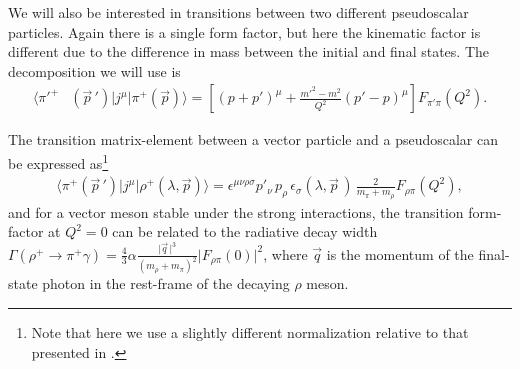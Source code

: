 We will also be interested in transitions between two different pseudoscalar particles. Again there is a single form factor, but here the kinematic factor is different due to the difference in mass between the initial and final states. The decomposition we will use is 
\begin{align}\label{eqn::pipip_decomp}
\big\langle \pi'^+ & (\vec{p}\,') \big| j^\mu \big| \pi^+(\vec{p}) \big\rangle = \left[ (p\!+\!p')^\mu \!+\! \tfrac{m'^2 - m^2}{Q^2} (p' \!-\! p)^\mu \right]\!  F_{\pi'\pi}(Q^2). 
\end{align} 

The transition matrix-element between a vector particle and a pseudoscalar can be expressed as\footnote{Note that here we use a slightly different normalization relative to that presented in .}
\begin{align}
\big\langle \pi^+(\vec{p}\,') \big| j^\mu \big| \rho^+(\lambda, \vec{p}) \big\rangle  = \epsilon^{\mu \nu \rho \sigma} p'_\nu\, p^{\,}_\rho \,\epsilon^{\,}_\sigma(\lambda, \vec{p}\,) \, \tfrac{2}{m_\pi + m_\rho} F_{\rho \pi}(Q^2),\label{rho_pi_ff}
\end{align} 
and for a vector meson stable under the strong interactions, the transition form-factor at ${Q^2=0}$ can be related to the radiative decay width ${\Gamma( \rho^+ \to \pi^+ \gamma) = \frac{4}{3} \alpha \frac{\lvert \vec{q}\,  \rvert^3}{(m_\rho + m_\pi)^2} \lvert F_{\rho \pi}(0) \rvert^2    }$, where $\vec{q}$ is the momentum of the final-state photon in the rest-frame of the decaying $\rho$ meson.


